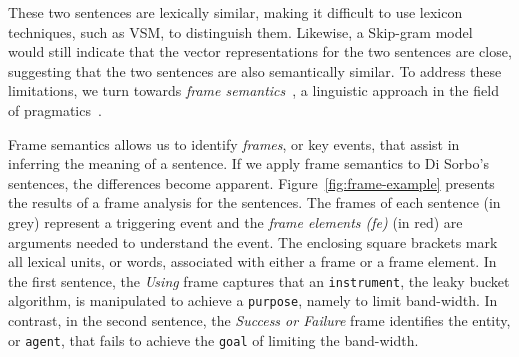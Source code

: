 These two sentences are lexically similar, making it
difficult to use lexicon techniques, such as \acs{VSM}, to distinguish them. Likewise, a Skip-gram model would still indicate that the vector representations for the two sentences are close, suggesting that the two sentences are also semantically similar. 
To address these limitations, we turn towards \textit{frame
semantics}~\cite{fillmore1976frame, Baker1998}, a 
linguistic approach in the field of pragmatics~\cite{ariel2008pragmatics, austin1975pragmatics}.



Frame semantics allows us to identify \textit{frames},
or key events, that assist in inferring the meaning of a sentence.
If we apply frame semantics to Di Sorbo's sentences, the differences become apparent.
Figure~\ref{fig:frame-example} presents the results of a frame
analysis for the sentences.
The frames of each sentence (in grey) represent a
triggering event and the \textit{frame elements (fe)} (in red) are arguments needed
to understand the event. The enclosing square brackets
mark all lexical units, or words,
associated with either a frame or a frame element.
In the first sentence, the \textit{Using} frame
captures that an \texttt{instrument}, the leaky bucket algorithm, is
manipulated to achieve a \texttt{purpose}, namely to limit band-width.
In contrast, in the second sentence, the \textit{Success or Failure}
frame identifies the entity, or \texttt{agent}, that fails to achieve the \texttt{goal} of limiting the band-width. 









